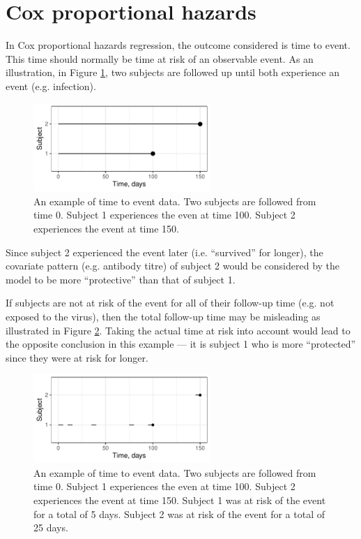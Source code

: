 \documentclass[12pt]{article}
\begin{document}
\pagebreak
\section{Cox proportional hazards}

In Cox proportional hazards regression, the outcome considered is time to event. This time should normally be time at risk of an observable event. As an illustration, in Figure \ref{CoxExampleFull}, two subjects are followed up until both experience an event (e.g. infection).

\begin{figure}[htp]
	\centering
	\includegraphics[width=0.6\textwidth]{../curve-cox/timeplot_1_light.pdf}
	\caption{
	An example of time to event data. Two subjects are followed from time 0. Subject 1 experiences the even at time 100. Subject 2 experiences the event at time 150.
	}
	\label{CoxExampleFull}
\end{figure}

Since subject 2 experienced the event later (i.e. ``survived'' for longer), the covariate pattern (e.g. antibody titre) of subject 2 would be considered by the model to be more ``protective'' than that of subject 1.

If subjects are not at risk of the event for all of their follow-up time (e.g. not exposed to the virus), then the total follow-up time may be misleading as illustrated in Figure \ref{CoxExamplePartial}. Taking the actual time at risk into account would lead to the opposite conclusion in this example --- it is subject 1 who is more ``protected'' since they were at risk for longer.

\begin{figure}[htp]
	\centering
	\includegraphics[width=0.6\textwidth]{../curve-cox/timeplot_2_light.pdf}
	\caption{
	An example of time to event data. Two subjects are followed from time 0. Subject 1 experiences the even at time 100. Subject 2 experiences the event at time 150. Subject 1 was at risk of the event for a total of 5 days. Subject 2 was at risk of the event for a total of 25 days.
	}
	\label{CoxExamplePartial}
\end{figure}
\end{document}

